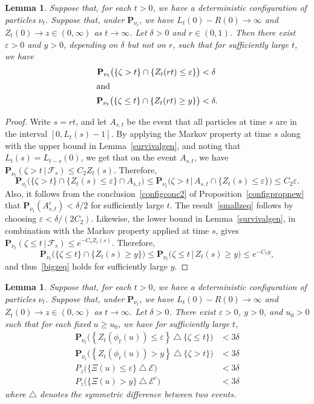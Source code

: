 \documentclass[10pt]{amsart}
\newtheorem{lemm}[theo]{Lemma}\newtheorem{prop}[theo]{Proposition}\newtheorem{coro}[theo]{Corollary}\newtheorem{conj}[theo]{Conjecture}
\theoremstyle{definition}\newtheorem{defi}[theo]{Definition}\newtheorem{rema}[theo]{Remark}\newtheorem{exam}[theo]{Example}\newtheorem{exem}[theo]{Example}\newtheorem{nota}[theo]{Notation}
\newcommand*\eps{\varepsilon}
\renewcommand*\P{\mathbf{P}}
\newcommand\F{\mathcal{F}}
\newcommand{\clE}{\mathcal{E}}
\newcommand{\1} {\mathds{1}}
\begin{document}
\begin{lemm}\label{zrare}
Suppose that, for each $t > 0$, we have a deterministic configuration of particles $\nu_t$. Suppose that, under $\P_{\nu_t}$, we have $L_t(0) - R(0) \rightarrow \infty$ and $Z_t(0) \rightarrow z \in (0, \infty)$ as $t \rightarrow \infty$. Let $\delta > 0$ and $r \in (0, 1)$. Then there exist $\eps > 0$ and $y > 0$, depending on $\delta$ but not on $r$, such that for sufficiently large $t$, we have
\begin{align}
\P_{\nu_t}\big(\{\zeta > t\} \cap \{Z_t(rt) \leq \eps\}\big) &< \delta
\label{smallzeq}\\
\intertext{and}
\P_{\nu_t}\big(\{\zeta \leq t\} \cap \{Z_t(rt) \geq y\}\big) &< \delta.\label{bigzeq}
\end{align}
\end{lemm}

\begin{proof}
Write $s = rt$, and let $A_{s,t}$ be the event that all particles at time $s$ are in the interval $[0, L_t(s) - 1]$. By applying the Markov property at time $s$ along with the upper bound in Lemma~\ref{survivalgen}, and noting that $L_t(s) = L_{t-s}(0)$, we get that on the event $A_{s,t}$, we have $\P_{\nu_t}(\zeta > t \,|\, \F_s) \leq C_2 Z_t(s)$. Therefore,
\[
\P_{\nu_t}\big(\{\zeta > t\} \cap \{Z_t(s) \leq \eps\} \cap A_{s,t}\big) \leq \P_{\nu_t}\big(\zeta > t \,\big|\, A_{s,t} \cap \{Z_t(s) \leq \eps\}\big) \leq C_2 \eps.
\]
Also, it follows from the conclusion~\eqref{configconc2} of Proposition~\ref{configpropnew} that $\P_{\nu_t}(A_{s,t}^c) < \delta/2$ for sufficiently large $t$. The result~\eqref{smallzeq} follows by choosing $\eps < \delta/(2C_2)$. Likewise, the lower bound in Lemma~\ref{survivalgen}, in combination with the Markov property applied at time $s$, gives $\P_{\nu_t}(\zeta \leq t \,|\, \F_s) \leq e^{-C_7 Z_t(s)}$. Therefore,
\[
\P_{\nu_t}\big(\{\zeta \leq t\} \cap \{Z_t(s) \geq y\}\big) \leq \P_{\nu_t}\big(\zeta \leq t \,\big|\, Z_t(s) \geq y\big)\leq e^{-C_7 y},
\]
and thus~\eqref{bigzeq} holds for sufficiently large $y$.
\end{proof}

\begin{lemm}\label{trilem}
Suppose that, for each $t > 0$, we have a deterministic configuration of particles $\nu_t$. Suppose that, under $\P_{\nu_t}$, we have $L_t(0) - R(0) \rightarrow \infty$ and $Z_t(0) \rightarrow z \in (0, \infty)$ as $t \rightarrow \infty$. Let $\delta > 0$. There exist $\eps > 0$, $y > 0$, and $u_0 > 0$ such that for each fixed $u \geq u_0$, we have for sufficiently large $t$,
\begin{align*}
\P_{\nu_t}\big(\left\{Z_t(\phi_t(u)) \leq \eps\right\} \: \triangle \: \{\zeta \leq t\}\big) &< 3\delta \\
\P_{\nu_t}\big(\left\{Z_t(\phi_t(u)) > y\right\} \: \triangle \: \{\zeta > t\}\big) &< 3\delta \\
P_z\big(\{\Xi(u) \leq \eps\} \: \triangle \: \clE\big) &< 3\delta \\
P_z\big(\{\Xi(u) > y\} \: \triangle \: \clE^c\big) &< 3\delta
\end{align*}
where $\triangle$ denotes the symmetric difference between two events.
\end{lemm}
\end{document}
